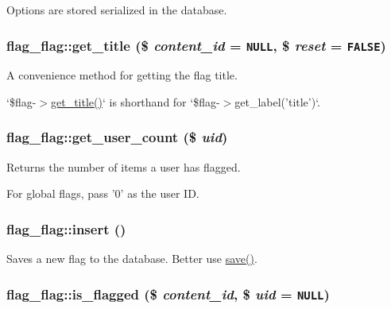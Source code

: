 Options are stored serialized in the database. \hypertarget{classflag__flag_826bf98cd0e5d8ae413d8d60e5b5a0d9}{
\subsubsection[{get\_\-title}]{\setlength{\rightskip}{0pt plus 5cm}flag\_\-flag::get\_\-title (\$ {\em content\_\-id} = {\tt NULL}, \/  \$ {\em reset} = {\tt FALSE})}}
\label{classflag__flag_826bf98cd0e5d8ae413d8d60e5b5a0d9}


A convenience method for getting the flag title.

`\$flag-$>$\hyperlink{classflag__flag_826bf98cd0e5d8ae413d8d60e5b5a0d9}{get\_\-title()}` is shorthand for `\$flag-$>$get\_\-label('title')`. \hypertarget{classflag__flag_868c7b3d72878b7c15ad7b007c9c7429}{
\subsubsection[{get\_\-user\_\-count}]{\setlength{\rightskip}{0pt plus 5cm}flag\_\-flag::get\_\-user\_\-count (\$ {\em uid})}}
\label{classflag__flag_868c7b3d72878b7c15ad7b007c9c7429}


Returns the number of items a user has flagged.

For global flags, pass '0' as the user ID. \hypertarget{classflag__flag_47d722a33b88e7e89c2bdf25651d665a}{
\subsubsection[{insert}]{\setlength{\rightskip}{0pt plus 5cm}flag\_\-flag::insert ()}}
\label{classflag__flag_47d722a33b88e7e89c2bdf25651d665a}


Saves a new flag to the database. Better use \hyperlink{classflag__flag_675d03274caed0ba6b3ecbb87f23f96b}{save()}. \hypertarget{classflag__flag_82aa6ee546607848f4df8688bfaf93bc}{
\subsubsection[{is\_\-flagged}]{\setlength{\rightskip}{0pt plus 5cm}flag\_\-flag::is\_\-flagged (\$ {\em content\_\-id}, \/  \$ {\em uid} = {\tt NULL})}}
\label{classflag__flag_82aa6ee546607848f4df8688bfaf93bc}


